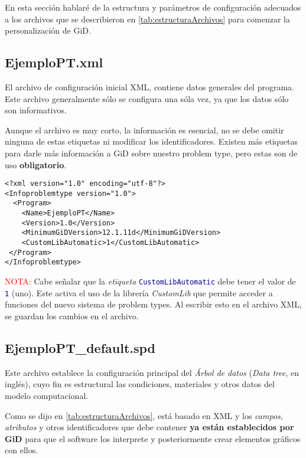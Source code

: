 \documentclass[10pt, a4paper, twocolumn]{article} %
\begin{document}
En esta sección hablaré de la estructura y parámetros de configuración adecuados a los archivos que se describieron en \ref{tab:estructuraArchivos} para comenzar la personalización de GiD.

\subsection{EjemploPT.xml}
\label{sec:codigoXML}
El archivo de configuración inicial XML, contiene datos generales del programa. Este archivo generalmente sólo se configura una sóla vez, ya que los datos sólo son informativos.

Aunque el archivo es muy corto, la información es esencial, no se debe omitir ninguna de estas etiquetas ni modificar los identificadores. Existen más etiquetas para darle más información a GiD sobre nuestro problem type, pero estas son de uso \textbf{obligatorio}.

\lstset{language=XML} 
\begin{lstlisting}
<?xml version="1.0" encoding="utf-8"?>
<Infoproblemtype version="1.0">
  <Program>
    <Name>EjemploPT</Name>
    <Version>1.0</Version>   
    <MinimumGiDVersion>12.1.11d</MinimumGiDVersion>
    <CustomLibAutomatic>1</CustomLibAutomatic>
 </Program>
</Infoproblemtype>
\end{lstlisting}

\textcolor{red}{NOTA:} Cabe señalar que la \textit{etiqueta} \texttt{\textcolor{darkblue}{CustomLibAutomatic}} debe tener el valor de \texttt{\textcolor{darkblue}{1}} (uno). Este activa el uso de la librería \textit{CustomLib} que permite acceder a funciones del nuevo sistema de problem types.
Al escribir esto en el archivo XML, se guardan los cambios en el archivo.

\subsection{EjemploPT\_default.spd}

Este archivo establece la configuración principal del \textit{Árbol de datos} (\textit{Data tree}, en inglés), cuyo fin es estructural las condiciones, materiales y otros datos del modelo computacional.

Como se dijo en \ref{tab:estructuraArchivos}, está basado en XML y los \textit{campos}, \textit{atributos} y otros identificadores que debe contener \textbf{ya están establecidos por GiD} para que el software los interprete y posteriormente crear elementos gráficos con ellos.
\end{document}
